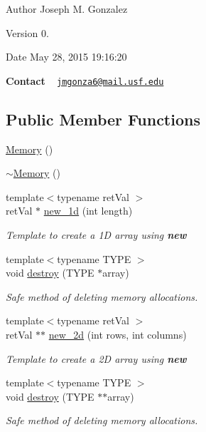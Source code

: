 \begin{DoxyAuthor}{Author}
Joseph M. Gonzalez
\end{DoxyAuthor}
\begin{DoxyVersion}{Version}
0.
\end{DoxyVersion}
\begin{DoxyDate}{Date}
May 28, 2015 19\+:16\+:20
\end{DoxyDate}
{\bfseries Contact} ~\newline
 \href{mailto:jmgonza6@mail.usf.edu}{\tt jmgonza6@mail.\+usf.\+edu} \subsection*{Public Member Functions}
\begin{DoxyCompactItemize}
\item 
\hyperlink{class_memory_a585d7bb6fc6f2237bcebf94a86b7dd99}{Memory} ()
\item 
\hyperlink{class_memory_a0ffa9759ebbf103f11132a505b93bdc0}{$\sim$\+Memory} ()
\item 
{\footnotesize template$<$typename ret\+Val $>$ }\\ret\+Val $\ast$ \hyperlink{class_memory_ac85016fc5b35830f5ba8755fcb763af5}{new\+\_\+1d} (int length)
\begin{DoxyCompactList}\small\item\em Template to create a 1\+D array using {\bfseries {\ttfamily new}} \end{DoxyCompactList}\item 
{\footnotesize template$<$typename T\+Y\+P\+E $>$ }\\void \hyperlink{class_memory_a35edb59e9a629c1239d01652edbf8f1f}{destroy} (T\+Y\+P\+E $\ast$array)
\begin{DoxyCompactList}\small\item\em Safe method of deleting memory allocations. \end{DoxyCompactList}\item 
{\footnotesize template$<$typename ret\+Val $>$ }\\ret\+Val $\ast$$\ast$ \hyperlink{class_memory_a6510b926e48e95476486b68ebbc919e8}{new\+\_\+2d} (int rows, int columns)
\begin{DoxyCompactList}\small\item\em Template to create a 2\+D array using {\bfseries {\ttfamily new}} \end{DoxyCompactList}\item 
{\footnotesize template$<$typename T\+Y\+P\+E $>$ }\\void \hyperlink{class_memory_a9157a913582b2096e4dbd656175766b2}{destroy} (T\+Y\+P\+E $\ast$$\ast$array)
\begin{DoxyCompactList}\small\item\em Safe method of deleting memory allocations. \end{DoxyCompactList}\end{DoxyCompactItemize}


